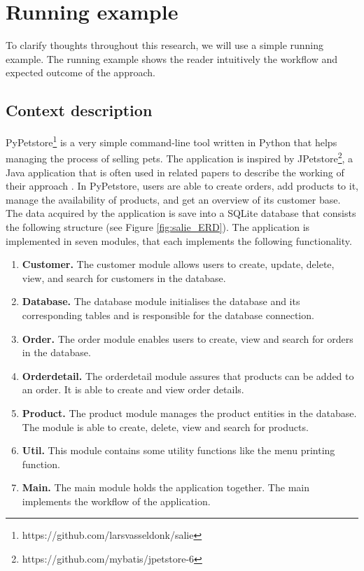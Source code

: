 \section{Running example}

To clarify thoughts throughout this research, we will use a simple running example. The running example shows the reader intuitively the workflow and expected outcome of the approach.

\subsection{Context description}
PyPetstore\footnote{https://github.com/larsvasseldonk/salie} is a very simple command-line tool written in Python that helps managing the process of selling pets. The application is inspired by JPetstore\footnote{https://github.com/mybatis/jpetstore-6}, a Java application that is often used in related papers to describe the working of their approach \cite{al2021microservice, jin2018functionality, jin2019service, saidani2019towards, zhang2020automated}. In PyPetstore, users are able to create orders, add products to it, manage the availability of products, and get an overview of its customer base. The data acquired by the application is save into a SQLite database that consists the following structure (see Figure \ref{fig:salie_ERD}). The application is implemented in seven modules, that each implements the following functionality.

\begin{enumerate}
    \item \textbf{Customer.} The customer module allows users to create, update, delete, view, and search for customers in the database.
    \item \textbf{Database.} The database module initialises the database and its corresponding tables and is responsible for the database connection.
    \item \textbf{Order.} The order module enables users to create, view and search for orders in the database.
    \item \textbf{Orderdetail.} The orderdetail module assures that products can be added to an order. It is able to create and view order details.
    \item \textbf{Product.} The product module manages the product entities in the database. The module is able to create, delete, view and search for products.
    \item \textbf{Util.} This module contains some utility functions like the menu printing function.
    \item \textbf{Main.} The main module holds the application together. The main implements the workflow of the application.
\end{enumerate}

